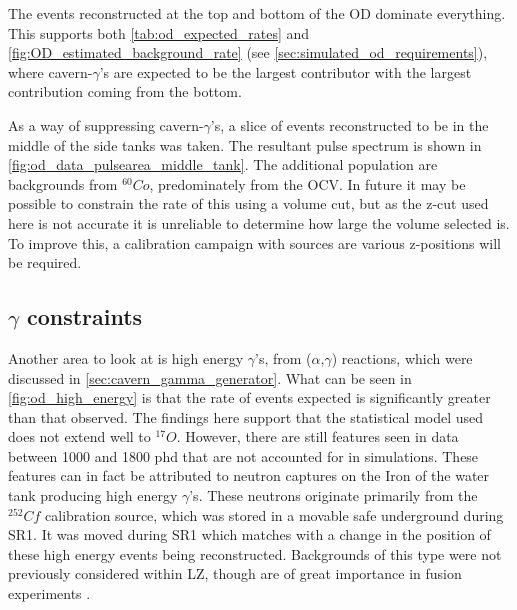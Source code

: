 \par
The events reconstructed at the top and bottom of the OD dominate everything.
This supports both \autoref{tab:od_expected_rates} and \autoref{fig:OD_estimated_background_rate} (see \autoref{sec:simulated_od_requirements}), where cavern-$\gamma$'s are expected to be the largest contributor with the largest contribution coming from the bottom. 

\par
As a way of suppressing cavern-$\gamma$'s, a slice of events reconstructed to be in the middle of the side tanks was taken.
The resultant pulse spectrum is shown in  \autoref{fig:od_data_pulsearea_middle_tank}.
The additional population are backgrounds from ${}^{60}Co$, predominately from the OCV.
In future it may be possible to constrain the rate of this using a volume cut, but as the z-cut used here is not accurate it is unreliable to determine how large the volume selected is.
To improve this, a calibration campaign with sources are various z-positions will be required.



\iffalse

\subsection{$\gamma$ constraints}
\par
Another area to look at is high energy $\gamma$'s, from ($\alpha$,$\gamma$) reactions, which were discussed in \autoref{sec:cavern_gamma_generator}.
What can be seen in \autoref{fig:od_high_energy} is that the rate of events expected is significantly greater than that observed.
The findings here support that the statistical model used does not extend well to ${}^{17}O$.
However, there are still features seen in data between 1000 and 1800 phd that are not accounted for in simulations.
These features can in fact be attributed to neutron captures on the Iron of the water tank producing high energy $\gamma$'s.
These neutrons originate primarily from the ${}^{252}Cf$ calibration source, which was stored in a movable safe underground during SR1.
It was moved during SR1 which matches with a change in the position of these high energy events being reconstructed.
Backgrounds of this type were not previously considered within LZ, though are of great importance in fusion experiments \cite{iter_neutrons_ref}.



